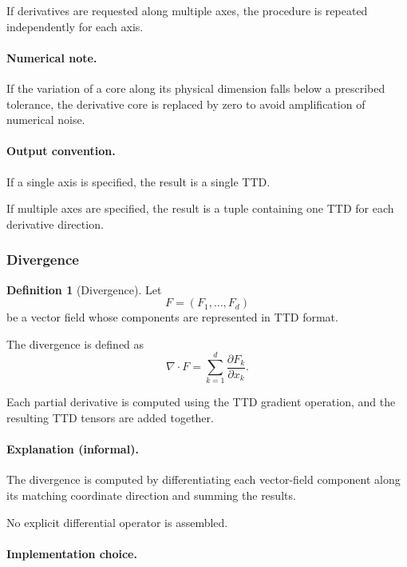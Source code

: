 \documentclass[11pt,a4paper,parskip=half-]{scrartcl}
\theoremstyle{definition}
\newtheorem{definition}{Definition}[section]
\theoremstyle{plain}
\theoremstyle{remark}
\begin{document}
If derivatives are requested along multiple axes,
the procedure is repeated independently for each axis.

\paragraph{Numerical note.}

If the variation of a core along its physical dimension
falls below a prescribed tolerance, the derivative core
is replaced by zero to avoid amplification of numerical noise.

\paragraph{Output convention.}

If a single axis is specified, the result is a single TTD.

If multiple axes are specified, the result is a tuple
containing one TTD for each derivative direction.

\subsubsection{Divergence}
\label{sec:divergence_ttd}

\begin{definition}[Divergence]

Let
\[
F = (F_1,\dots,F_d)
\]
be a vector field whose components are represented in TTD format.

The divergence is defined as
\[
\nabla \cdot F
=
\sum_{k=1}^d
\frac{\partial F_k}{\partial x_k}.
\]

Each partial derivative is computed using the TTD gradient operation,
and the resulting TTD tensors are added together.

\end{definition}

\paragraph{Explanation (informal).}

The divergence is computed by differentiating each vector-field component
along its matching coordinate direction and summing the results.

No explicit differential operator is assembled.

\paragraph{Implementation choice.}
\end{document}
